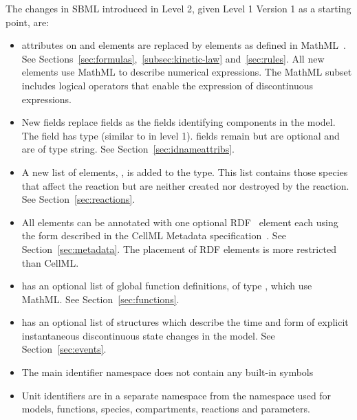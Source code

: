 \documentclass[10pt]{cekarticle}
\begin{document}
The changes in SBML introduced in Level 2, given Level 1 Version 1
as a starting point, are:

\begin{itemize}
\item {} attributes on  and
 elements are replaced by  elements as
defined in MathML~\citep{w3c:2000b}.  See
Sections~\ref{sec:formulas},~\ref{subsec:kinetic-law}
and~\ref{sec:rules}.  All new elements use MathML to describe
numerical expressions.  The MathML subset includes logical operators that enable the expression of discontinuous expressions.

\item New  fields replace  fields as the
fields identifying components in the model. The  field
has type  (similar to  in level 1).
 fields remain but are optional and are of type
string.  See Section~\ref{sec:idnameattribs}.

\item A new list of elements, , is added
to the  type.  This list contains those species
that affect the reaction but are neither created nor destroyed by
the reaction.  See Section~\ref{sec:reactions}.

\item All elements can be annotated with one optional
RDF~\citep{lassila:1999} element each using the form described in
the CellML Metadata specification~\citep{cuellar:2002}.  See
Section~\ref{sec:metadata}.  The placement of RDF elements is more
restricted than CellML.

\item {} has an optional list of global function
definitions, of type , which use MathML. See
Section~\ref{sec:functions}.

\item {} has an optional list of 
structures which describe the time and form of explicit instantaneous discontinuous state changes in the model.  See Section~\ref{sec:events}.

\item The main identifier namespace does not contain any built-in
symbols

\item Unit identifiers are in a separate namespace from the
namespace used for models, functions, species, compartments,
reactions and parameters.


\end{itemize}
\end{document}

